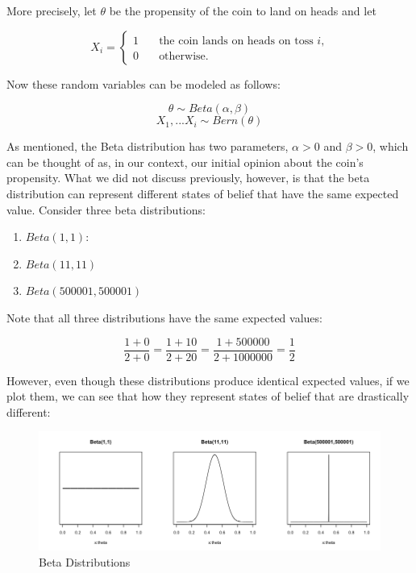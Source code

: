 More precisely, let \(\theta\) be the propensity of the coin to land on
heads and let

\[
X_i =
\begin{cases}
   1       & \quad \text{the coin lands on heads on toss $i$,}\\
   0 & \quad \text{otherwise.}
 \end{cases}\]

Now these random variables can be modeled as follows:

\[\theta \sim Beta(\alpha, \beta)\] \[X_1,...X_i \sim Bern(\theta)\]

As mentioned, the Beta distribution has two parameters, \(\alpha>0\) and
\(\beta>0\), which can be thought of as, in our context, our initial
opinion about the coin's propensity. What we did not discuss previously,
however, is that the beta distribution can represent different states of
belief that have the same expected value. Consider three beta
distributions:

\begin{enumerate}
\def\labelenumi{\arabic{enumi}.}
\tightlist
\item
  \(Beta(1,1)\):
\item
  \(Beta(11,11)\)
\item
  \(Beta(500001,500001)\)
\end{enumerate}

\noindent Note that all three distributions have the same expected
values:

\[\frac{1 + 0}{2 + 0}=\frac{1 + 10}{2 + 20}=\frac{1 + 500000}{2 + 1000000}=\frac{1}{2}\]

\noindent However, even though these distributions produce identical
expected values, if we plot them, we can see that how they represent
states of belief that are drastically different:

\begin{figure}
\centering
\includegraphics[scale=.3]{beta}
\caption{Beta Distributions}
\label{fig:differentbeta}
\end{figure}

